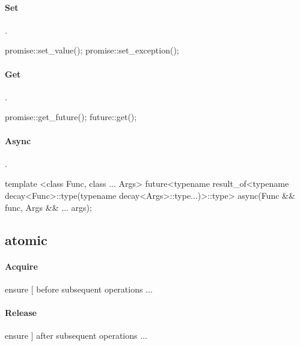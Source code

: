\paragraph{Set}{.}
\begin{code}
promise::set_value(); promise::set_exception();
\end{code}

\paragraph{Get}{.}
\begin{code}
promise::get_future(); future::get();
\end{code}

\paragraph{Async}{.}
\begin{code}
template <class Func, class ... Args>
future<typename result_of<typename decay<Func>::type(typename decay<Args>::type...)>::type>
async(Func && func, Args && ... args);
\end{code}

\subsection*{atomic}
\paragraph{Acquire}{\inlinecode{acquire : [ ...}}
\begin{code}
ensure [ before subsequent operations ...
\end{code}

\paragraph{Release}{\inlinecode{release : ... ]}}
\begin{code}
ensure ] after  subsequent operations ...
\end{code}

